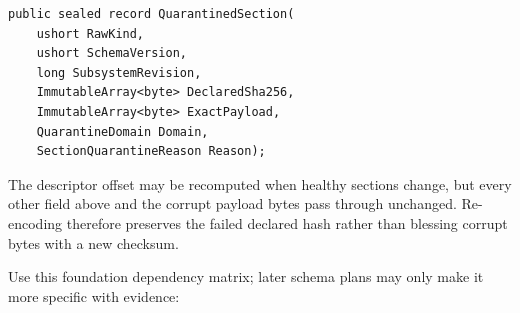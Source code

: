 \documentclass[
  10pt,
  letterpaper,
]{article}
\begin{document}
\begin{lstlisting}
public sealed record QuarantinedSection(
    ushort RawKind,
    ushort SchemaVersion,
    long SubsystemRevision,
    ImmutableArray<byte> DeclaredSha256,
    ImmutableArray<byte> ExactPayload,
    QuarantineDomain Domain,
    SectionQuarantineReason Reason);
\end{lstlisting}

The descriptor offset may be recomputed when healthy sections change,
but every other field above and the corrupt payload bytes pass through
unchanged. Re-encoding therefore preserves the failed declared hash
rather than blessing corrupt bytes with a new checksum.

Use this foundation dependency matrix; later schema plans may only make
it more specific with evidence:
\end{document}
